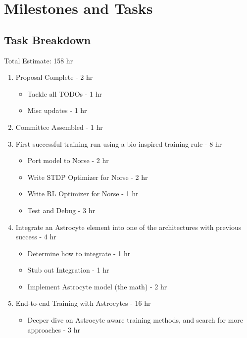 %
%

\chapter{Milestones and Tasks}\label{chapter:miles_and_tasks}
\section{Task Breakdown}
Total Estimate: 158 hr
\begin{enumerate}
    \item \label{task:proposal} Proposal Complete - 2 hr
        \begin{itemize}
            \item Tackle all TODOs - 1 hr
            \item Misc updates - 1 hr
        \end{itemize}
    \item \label{task:committe} Committee Assembled - 1 hr
    \item \label{task:train_success} First successful training run using a bio-inspired training rule - 8 hr 
        \begin{itemize}
            \item Port model to Norse - 2 hr
            \item Write STDP Optimizer for Norse - 2 hr
            \item Write RL Optimizer for Norse - 1 hr
            \item Test and Debug - 3 hr
        \end{itemize}
    \item \label{task:astrocyte} Integrate an Astrocyte element into one of the architectures with previous success - 4 hr
        \begin{itemize}
            \item Determine how to integrate - 1 hr
            \item Stub out Integration - 1 hr
            \item Implement Astrocyte model (the math) - 2 hr
        \end{itemize}
    \item \label{task:astro_train} End-to-end Training with Astrocytes - 16 hr
        \begin{itemize}
            \item Deeper dive on Astrocyte aware training methods, and search for more approaches - 3 hr

\end{itemize}
\end{enumerate}
